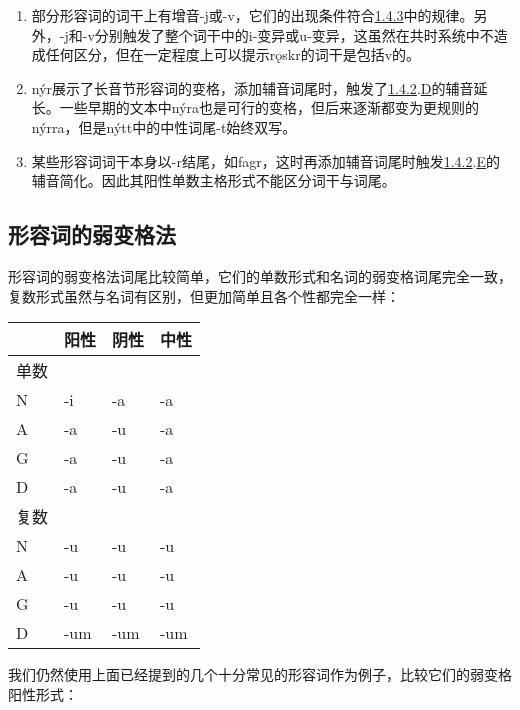 \begin{enumerate}
\def\labelenumi{\arabic{enumi})}
\setcounter{enumi}{2}
\item
  部分形容词的词干上有增音-j或-v，它们的出现条件符合\hyperref[ux534aux5143ux97f3ux7684ux4fddux6301ux6027]{1.4.3}中的规律。另外，-j和-v分别触发了整个词干中的i-变异或u-变异，这虽然在共时系统中不造成任何区分，但在一定程度上可以提示rǫskr的词干是包括v的。
\item
  nýr展示了长音节形容词的变格，添加辅音词尾时，触发了\hyperref[ux8f85ux97f3ux7684ux97f3ux53d8]{1.4.2}.\hyperref[_Ref116211616]{D}的辅音延长。一些早期的文本中nýra也是可行的变格，但后来逐渐都变为更规则的nýrra，但是nýtt中的中性词尾-t始终双写。
\item
  某些形容词词干本身以-r结尾，如fagr，这时再添加辅音词尾时触发\hyperref[ux8f85ux97f3ux7684ux97f3ux53d8]{1.4.2}.\hyperref[_Ref115765758]{E}的辅音简化。因此其阳性单数主格形式不能区分词干与词尾。
\end{enumerate}

\subsection{形容词的弱变格法}\label{ux5f62ux5bb9ux8bcdux7684ux5f31ux53d8ux683cux6cd5}

形容词的弱变格法词尾比较简单，它们的单数形式和名词的弱变格词尾完全一致，复数形式虽然与名词有区别，但更加简单且各个性都完全一样：

\begin{longtable}{llll}
\toprule
 & 阳性 & 阴性 & 中性 \\
\midrule
\endhead
\bottomrule
\endfoot
单数 & & & \\
N & -i & -a & -a \\
A & -a & -u & -a \\
G & -a & -u & -a \\
D & -a & -u & -a \\
复数 & & & \\
N & -u & -u & -u \\
A & -u & -u & -u \\
G & -u & -u & -u \\
D & -um & -um & -um \\
\end{longtable}

我们仍然使用上面已经提到的几个十分常见的形容词作为例子，比较它们的弱变格阳性形式：

